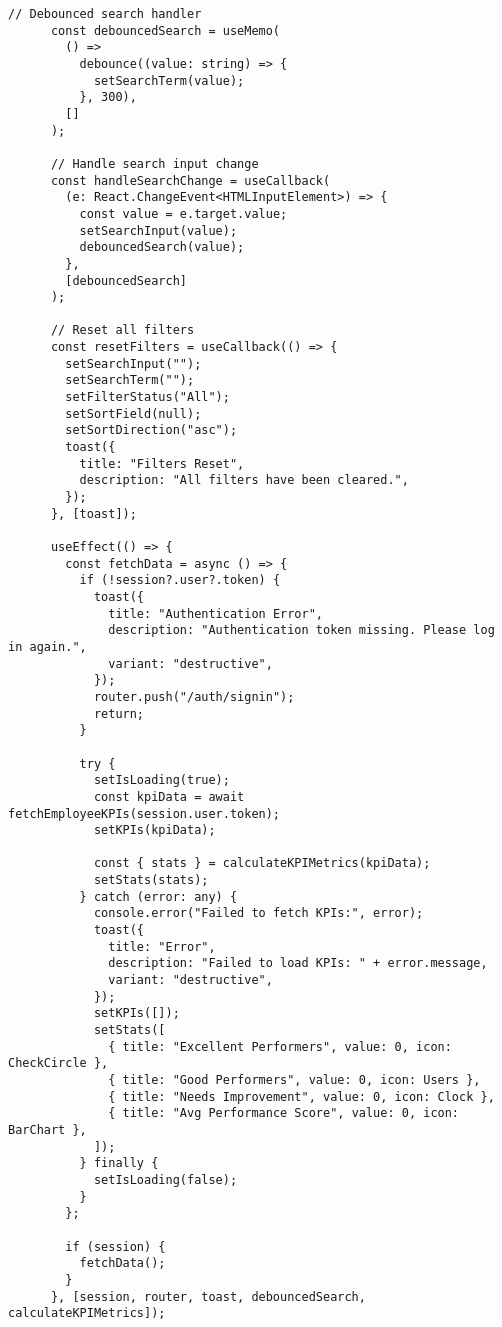 \begin{lstlisting}[language=Golang, caption=Routes, frame=single]
      // Debounced search handler
      const debouncedSearch = useMemo(
        () =>
          debounce((value: string) => {
            setSearchTerm(value);
          }, 300),
        []
      );
    
      // Handle search input change
      const handleSearchChange = useCallback(
        (e: React.ChangeEvent<HTMLInputElement>) => {
          const value = e.target.value;
          setSearchInput(value);
          debouncedSearch(value);
        },
        [debouncedSearch]
      );
    
      // Reset all filters
      const resetFilters = useCallback(() => {
        setSearchInput("");
        setSearchTerm("");
        setFilterStatus("All");
        setSortField(null);
        setSortDirection("asc");
        toast({
          title: "Filters Reset",
          description: "All filters have been cleared.",
        });
      }, [toast]);
    
      useEffect(() => {
        const fetchData = async () => {
          if (!session?.user?.token) {
            toast({
              title: "Authentication Error",
              description: "Authentication token missing. Please log in again.",
              variant: "destructive",
            });
            router.push("/auth/signin");
            return;
          }
    
          try {
            setIsLoading(true);
            const kpiData = await fetchEmployeeKPIs(session.user.token);
            setKPIs(kpiData);
    
            const { stats } = calculateKPIMetrics(kpiData);
            setStats(stats);
          } catch (error: any) {
            console.error("Failed to fetch KPIs:", error);
            toast({
              title: "Error",
              description: "Failed to load KPIs: " + error.message,
              variant: "destructive",
            });
            setKPIs([]);
            setStats([
              { title: "Excellent Performers", value: 0, icon: CheckCircle },
              { title: "Good Performers", value: 0, icon: Users },
              { title: "Needs Improvement", value: 0, icon: Clock },
              { title: "Avg Performance Score", value: 0, icon: BarChart },
            ]);
          } finally {
            setIsLoading(false);
          }
        };
    
        if (session) {
          fetchData();
        }
      }, [session, router, toast, debouncedSearch, calculateKPIMetrics]);
    

\end{lstlisting}
